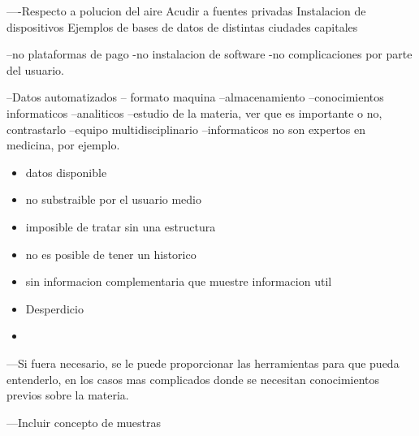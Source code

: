     ----Respecto a polucion del aire 
    Acudir a fuentes privadas
    Instalacion de dispositivos
    Ejemplos de bases de datos de distintas ciudades capitales


    --no plataformas de pago
-no instalacion de software
-no complicaciones por parte del usuario.

--Datos automatizados -- formato maquina
--almacenamiento
--conocimientos informaticos
--analiticos
--estudio de la materia, ver que es importante o no, contrastarlo
--equipo multidisciplinario
--informaticos no son expertos en medicina, por ejemplo.
\begin{itemize}

    \item datos disponible
    \item no substraible por el usuario medio
    \item imposible de tratar sin una estructura
    \item no es posible de tener un historico
    \item sin informacion complementaria que muestre informacion util
    \item Desperdicio
    \item \end{itemize}

---Si fuera necesario, se le puede proporcionar las herramientas para que pueda entenderlo, en los 
casos mas complicados donde se necesitan conocimientos previos sobre la materia.

---Incluir concepto de muestras
    